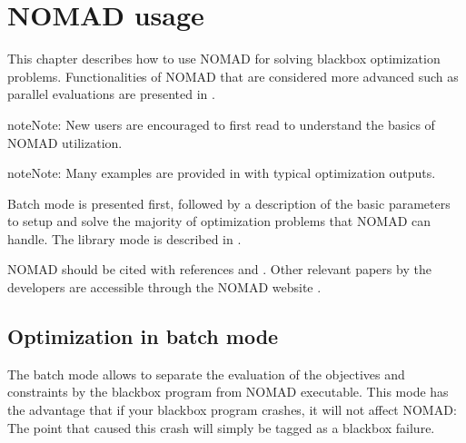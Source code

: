 \documentclass[letterpaper,10pt,english]{sphinxmanual}
\begin{document}
\chapter{NOMAD usage}
\label{\detokenize{HowToUseNomad:nomad-usage}}\label{\detokenize{HowToUseNomad:basic-nomad-usage}}\label{\detokenize{HowToUseNomad::doc}}
\sphinxAtStartPar
This chapter describes how to use NOMAD for solving blackbox optimization problems. Functionalities of NOMAD that are considered more advanced such as parallel evaluations are presented in {\hyperref[\detokenize{AdvancedFunctionalities:advanced-functionalities}]{}}.

\begin{sphinxadmonition}{note}{Note:}
\sphinxAtStartPar
New users are encouraged to first read {\hyperref[\detokenize{GettingStarted:getting-started}]{}} to understand the basics of NOMAD utilization.
\end{sphinxadmonition}

\begin{sphinxadmonition}{note}{Note:}
\sphinxAtStartPar
Many examples are provided in  with typical optimization outputs.
\end{sphinxadmonition}

\sphinxAtStartPar
Batch mode is presented first, followed by a description of the basic parameters to setup and solve the majority of optimization problems that NOMAD can handle. The library mode is described in {\hyperref[\detokenize{LibraryMode:library-mode}]{}}.

\sphinxAtStartPar
NOMAD should be cited with references  and . Other relevant papers by the developers are accessible through  the NOMAD website  .

\begin{sphinxShadowBox}
\end{sphinxShadowBox}


\section{Optimization in batch mode}
\label{\detokenize{HowToUseNomad:optimization-in-batch-mode}}
\sphinxAtStartPar
The batch mode allows to separate the evaluation of the objectives and constraints by the blackbox program from NOMAD executable. This mode has the advantage that if your blackbox program crashes, it will not affect NOMAD: The point that caused this crash will simply be tagged as a blackbox failure.
\end{document}

